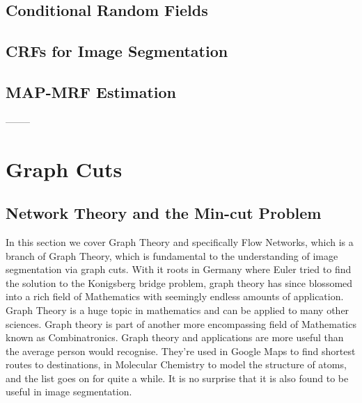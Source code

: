 \subsection{Conditional Random Fields}
\label{sec:ConditionalRandomFields}


\subsection{CRFs for Image Segmentation}
\label{sec:ConditionalRandomFieldsForImageSegmentation}


\subsection{MAP-MRF Estimation}
\label{sec:MAPMRFEstimation}

--------

\section{Graph Cuts}
\label{sec:GraphCuts}


\subsection{Network Theory and the Min-cut Problem}
\label{sec:NetworkTheory}

In this section we cover Graph Theory and specifically Flow Networks, which is a branch of Graph Theory, which is fundamental to the understanding of image segmentation via graph cuts. With it roots in Germany where Euler tried to find the solution to the Konigsberg bridge problem, graph theory has since blossomed into a rich field of Mathematics with seemingly endless amounts of application. Graph Theory is a huge topic in mathematics and can be applied to many other sciences. Graph theory is part of another more encompassing field of Mathematics known as Combinatronics. Graph theory and applications are more useful than the average person would recognise. They're used in Google Maps to find shortest routes to destinations, in Molecular Chemistry to model the structure of atoms, and the list goes on for quite a while. It is no surprise that it is also found to be useful in image segmentation.

